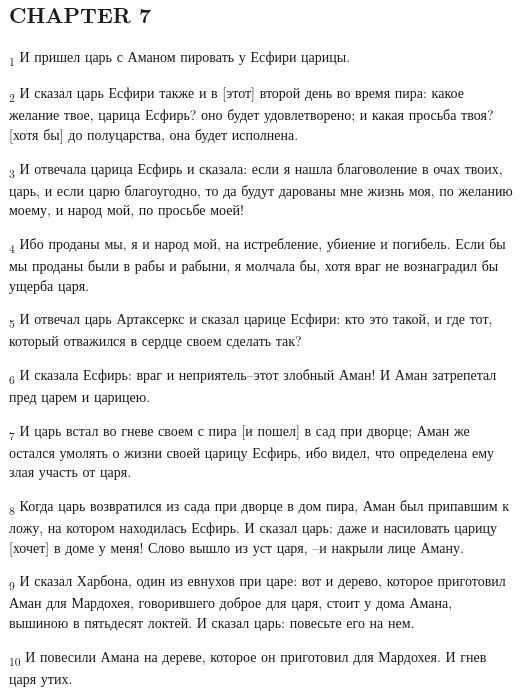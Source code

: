 \subsection{CHAPTER 7}
\begin{tcolorbox}
\textsubscript{1} И пришел царь с Аманом пировать у Есфири царицы.
\end{tcolorbox}
\begin{tcolorbox}
\textsubscript{2} И сказал царь Есфири также и в [этот] второй день во время пира: какое желание твое, царица Есфирь? оно будет удовлетворено; и какая просьба твоя? [хотя бы] до полуцарства, она будет исполнена.
\end{tcolorbox}
\begin{tcolorbox}
\textsubscript{3} И отвечала царица Есфирь и сказала: если я нашла благоволение в очах твоих, царь, и если царю благоугодно, то да будут дарованы мне жизнь моя, по желанию моему, и народ мой, по просьбе моей!
\end{tcolorbox}
\begin{tcolorbox}
\textsubscript{4} Ибо проданы мы, я и народ мой, на истребление, убиение и погибель. Если бы мы проданы были в рабы и рабыни, я молчала бы, хотя враг не вознаградил бы ущерба царя.
\end{tcolorbox}
\begin{tcolorbox}
\textsubscript{5} И отвечал царь Артаксеркс и сказал царице Есфири: кто это такой, и где тот, который отважился в сердце своем сделать так?
\end{tcolorbox}
\begin{tcolorbox}
\textsubscript{6} И сказала Есфирь: враг и неприятель--этот злобный Аман! И Аман затрепетал пред царем и царицею.
\end{tcolorbox}
\begin{tcolorbox}
\textsubscript{7} И царь встал во гневе своем с пира [и пошел] в сад при дворце; Аман же остался умолять о жизни своей царицу Есфирь, ибо видел, что определена ему злая участь от царя.
\end{tcolorbox}
\begin{tcolorbox}
\textsubscript{8} Когда царь возвратился из сада при дворце в дом пира, Аман был припавшим к ложу, на котором находилась Есфирь. И сказал царь: даже и насиловать царицу [хочет] в доме у меня! Слово вышло из уст царя, --и накрыли лице Аману.
\end{tcolorbox}
\begin{tcolorbox}
\textsubscript{9} И сказал Харбона, один из евнухов при царе: вот и дерево, которое приготовил Аман для Мардохея, говорившего доброе для царя, стоит у дома Амана, вышиною в пятьдесят локтей. И сказал царь: повесьте его на нем.
\end{tcolorbox}
\begin{tcolorbox}
\textsubscript{10} И повесили Амана на дереве, которое он приготовил для Мардохея. И гнев царя утих.
\end{tcolorbox}
